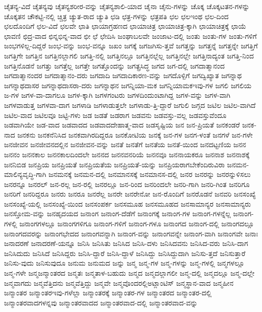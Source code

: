 {ಚೈತನ್ಯ-ವಿದೆ
ಚೈತನ್ಯವು
ಚೈತನ್ಯಶರೀರ-ವನ್ನು
ಚೈತನ್ಯಶಾಲಿ-ಯಾದ
ಚೈನಾ
ಚೈನು-ಗಳನ್ನು
ಚೊಕ್ಕ
ಚೊಕ್ಕಟತನ-ಗಳನ್ನು
ಚೊಕ್ಕತನ
ಚೌಕಟ್ಟಿ-ನಲ್ಲಿ
ಚ್ಚಿತ್ರ
ಚ್ಯುತ-ರಾದ
ಚ್ಯುತಿ
ಛಡಿ
ಛತ್ರ-ಗಳನ್ನು
ಛತ್ರಪತಿ
ಛಲ
ಛಲಇಂಥ
ಛಲ-ದಿಂದ
ಛಲದೊಂದಿಗೆ
ಛಲ-ವಿದೆ
ಛಲವೇ
ಛಾತಿ
ಛಾಯಾಗ್ರಹಣದ
ಛಾಯಾಚಿತ್ರ
ಛಾಯಾಚಿತ್ರ-ಕ್ಕಾಗಿ
ಛಾಯಾಚಿತ್ರಕ್ಕೆ
ಛಾಯೆ
ಛಾವಣಿ
ಛಿದ್ರ-ವಾದ
ಛಿನ್ನಭಿನ್ನ-ವಾದ
ಛೀ
ಛೆ
ಛೇದಿಸಿ
ಜಂಘಾಬಲವೇ
ಜಂಜಾಟ-ದಲ್ಲಿ
ಜಂತು
ಜಂತು-ಗಳ
ಜಂತು-ಗಳಿಗೆ
ಜಂಭಗಳಿಲ್ಲ-ದಿದ್ದರೆ
ಜಂಭ-ವನ್ನು
ಜಂಭ-ವನ್ನೂ
ಜಖಂ
ಜಗಕ್ಕೆ
ಜಗಜಗಿಸು-ತ್ತವೆ
ಜಗತ್ತನ್ನು
ಜಗತ್ತನ್ನೆ
ಜಗತ್ತನ್ನೇ
ಜಗತ್ತಿಗೆ
ಜಗತ್ತಿಗೇ
ಜಗತ್ತಿನ
ಜಗತ್ತಿನಲ್ಲಾಗಲಿ
ಜಗತ್ತಿ-ನಲ್ಲಿ
ಜಗತ್ತಿನಲ್ಲೂ
ಜಗತ್ತಿನಲ್ಲೆಲ್ಲ
ಜಗತ್ತಿನಲ್ಲೇ
ಜಗತ್ತಿನಾದ್ಯಂತ
ಜಗತ್ತಿ-ನಿಂದ
ಜಗತ್ತಿನೊಡನೆ
ಜಗತ್ತು
ಜಗತ್ತೆಲ್ಲ
ಜಗತ್ತೇ
ಜಗತ್ತೊಂದನ್ನು
ಜಗತ್ಪ್ರಸಿದ್ಧ
ಜಗದ
ಜಗ-ದಲ್ಲಿ
ಜಗದಾತ್ಮಾನಂದ
ಜಗದಾತ್ಮಾನಂದರ
ಜಗದಾತ್ಮಾನಂ-ದರು
ಜಗದಾದಿ
ಜಗದಾದಿಕಾರಣ-ವನ್ನು
ಜಗದೊಳ್ಪಿಗೆ
ಜಗದ್ವಿಖ್ಯಾತ
ಜಗನ್ನಾಥ
ಜಗನ್ನಾಥದಾಸರ
ಜಗನ್ನಾಥದಾಸರಾ-ದರು
ಜಗನ್ನಾಥನ
ಜಗನ್ನಿಯಾ-ಮಕ
ಜಗನ್ನಿಯಾಮಕಇವು-ಗಳ
ಜಗಲಿ
ಜಗಲಿಯ
ಜ-ಗಳ
ಜಗಳ-ವಾ-ದಾಗಲೂ
ಜಗಳ-ಕ್ಕಾಗಿ
ಜಗಳಗಂಟರು
ಜಗಳದಿಂದುಂಟಾಗಿದ್ದ
ಜಗಳ-ವನ್ನು
ಜಗಳ-ವಾಗಿ
ಜಗಳವಾಡುತ್ತ
ಜಗಳವಾ-ದಾಗ
ಜಗಳಾಡಿ
ಜಗಳಾಡುತ್ತಲೇ
ಜಗಳಾಡು-ತ್ತಿ-ದ್ದಾರೆ
ಜಗುಲಿ
ಜಗ್ಗದ
ಜಟಿಲ
ಜಟಿಲ-ವಾಗಿದೆ
ಜಟಿಲ-ವಾದ
ಜಟಿಲವೂ
ಜಟ್ಟಿ-ಗಳು
ಜಡ
ಜಡತೆ
ಜಡರಾಗ
ಜಡವನು
ಜಡವಸ್ತು-ವಲ್ಲ
ಜಡವಸ್ತುವೆಂದೂ
ಜಡವಾಗಿಯೇ
ಜಡ-ವಾದ
ಜಡವಾದದ
ಜಡವಾದದೇಹಾತ್ಮ-ವಾದ
ಜಡಸೃಷ್ಟಿಯ
ಜನ
ಜನ-ಪ್ರಿಯತೆ
ಜನಕಂಡರೆ
ಜನಕ-ನಾದ
ಜನಕನು
ಜನಕನೆನಿಸಿದ
ಜನಕವಾಗಿರದಿದ್ದರೂ
ಜನಕೋಟಿಯ
ಜನಕ್ಕೆ
ಜನ-ಗಳ
ಜನಗ-ಳಂತೆ
ಜನಗಳೆ
ಜನ-ಗಳೇ
ಜನಜೀವನ
ಜನಜೀವನದಲ್ಲಿನ
ಜನಜೀವನ-ವನ್ನು
ಜನತೆ
ಜನತೆಗೆ
ಜನತೆಯ
ಜನತೆ-ಯಿಂದ
ಜನದಟ್ಟಣಿಯ
ಜನನ
ಜನನಂ
ಜನನಕಾಲ
ಜನನಕಾಲದಿಂದಲೇ
ಜನನದ
ಜನನವನರಿಯೆ
ಜನನವೂ
ಜನನಾಯಕರೂ
ಜನನಾಶ
ಜನನಾಶಕ್ಕೆ
ಜನನಿಬಿಡ
ಜನಪ್ರಿಯ
ಜನಪ್ರಿಯತೆ
ಜನಪ್ರಿಯತೆಯ
ಜನಪ್ರಿಯತೆ-ಯನ್ನು
ಜನಪ್ರಿಯರಾಗಬೇಕೆಂದಿರುವಿರಾ
ಜನಮನ-ಮಾಲಿನ್ಯವೃದ್ಧಿ-ಗಾಗಿ
ಜನಮನಕ್ಕೆ
ಜನಮನ-ದಲ್ಲಿ
ಜನಮಾನಸಕ್ಕೆ
ಜನಮಾನಸ-ದಲ್ಲಿ
ಜನರ
ಜನರನ್ನು
ಜನರನ್ನುಳಿಸಲು
ಜನರನ್ನೂ
ಜನರಲ್
ಜನ-ರಲ್ಲ
ಜನ-ರಲ್ಲಿ
ಜನರಲ್ಲೂ
ಜನ-ರಿಂದ
ಜನರಿಂದಲೇ
ಜನರಿ-ಗಾಗಿ
ಜನರಿ-ಗಿಂತ
ಜನರಿಗೂ
ಜನರಿಗೆ
ಜನರಿದ್ದರೂ
ಜನರು
ಜನರೂ
ಜನರೆಲ್ಲ
ಜನರೇ
ಜನರೇನೋ
ಜನ-ರೊಂದಿಗೆ
ಜನರೊಡನೆ
ಜನವರಿ
ಜನಸಂಖ್ಯೆ
ಜನಸಂಖ್ಯೆ-ಯಲ್ಲಿ
ಜನಸಂಖ್ಯೆ-ಯಿಂದ
ಜನಸಂಪರ್ಕ
ಜನಸಮೂಹ
ಜನಸಮೂಹದ
ಜನಸಾಮಾನ್ಯರ
ಜನಸಾಮಾನ್ಯರು
ಜನಸ್ತೋಮ-ವನ್ನು
ಜನಹೃದಯದ
ಜನಾಂಗ
ಜನಾಂಗ-ದೆಡೆಗೆ
ಜನಾಂಗಕ್ಕೆ
ಜನಾಂಗ-ಗಳ
ಜನಾಂಗ-ಗಳನ್ನೆಲ್ಲ
ಜನಾಂಗ-ಗಳಲ್ಲಿ
ಜನಾಂಗಗಳಲ್ಲೂ
ಜನಾಂಗಗಳಿಗೂ
ಜನಾಂಗ-ಗಳಿಗೆ
ಜನಾಂಗ-ಗಳೂ
ಜನಾಂಗದ
ಜನಾಂಗ-ದಲ್ಲಿ
ಜನಾಂಗದಲ್ಲೂ
ಜನಾಂಗದವರನ್ನು
ಜನಾಂಗಭೇದದ
ಜನಾಂಗವನ್ನಾಗಿ
ಜನಾಂಗ-ವನ್ನು
ಜನಾಂಗವನ್ನೇ
ಜನಾಂಗ-ವಾಗಿ
ಜನಾಂಗವೇ
ಜನಾಃ
ಜನಾದರಣೆ
ಜನಾದರಣೆ-ಯನ್ನೂ
ಜನಿಸಿ
ಜನಿಸಿತು
ಜನಿಸಿದ
ಜನಿಸಿ-ದಳು
ಜನಿಸಿದವನು
ಜನಿಸಿದ-ವರು
ಜನಿಸಿ-ದಾಗ
ಜನಿಸಿದುದು
ಜನಿಸಿದೆ
ಜನಿಸಿದ್ದರು
ಜನಿಸಿ-ದ್ದಾರೆ
ಜನಿಸಿ-ದ್ದಾಳೆ
ಜನಿಸಿದ್ದು
ಜನಿಸಿದ್ದುದಾಗಿ
ಜನಿಸು-ತ್ತದೆ
ಜನಿಸುತ್ತಾರೆ
ಜನಿಸು-ವುದು
ಜನಿಸುವುದೂ
ಜನುಮ
ಜನುಮದ
ಜನ್ನು
ಜನ್ಮ
ಜನ್ಮ-ಗಳ
ಜನ್ಮ-ಗಳನ್ನು
ಜನ್ಮ-ಗಳಲ್ಲಿ
ಜನ್ಮಗಳಲ್ಲೂ
ಜನ್ಮ-ಗಳೇ
ಜನ್ಮಜನ್ಮಾಂತರದ
ಜನ್ಮತಃ
ಜನ್ಮತಾಳ-ಬಹುದು
ಜನ್ಮದ
ಜನ್ಮದಲ್ಲಾಗಲೀ
ಜನ್ಮ-ದಲ್ಲಿ
ಜನ್ಮದಲ್ಲೂ
ಜನ್ಮ-ದಲ್ಲೇ
ಜನ್ಮವಾಗದು
ಜನ್ಮವೆತ್ತಿದನು
ಜನ್ಮವೆತ್ತಿದ್ದು
ಜನ್ಮವೇ
ಜನ್ಮವೊಂದರಲ್ಲಿಅಟ್ಲಾಂಟಿಸ್
ಜನ್ಮಸ್ಥಾನ-ವಾದ
ಜನ್ಮಹೀನ
ಜನ್ಮಾಂತರ
ಜನ್ಮಾಂತರಇವು-ಗಳೆಲ್ಲಾ
ಜನ್ಮಾಂತರಕ್ಕೆ
ಜನ್ಮಾಂತರ-ಗಳ
ಜನ್ಮಾಂತರದ
ಜನ್ಮಾಂತರ-ದಲ್ಲಿ
ಜನ್ಮಾಂತರವಾದಗಳನ್ನವು
ಜನ್ಮಾಂತರವಾದದ
ಜನ್ಮಾಂತರವಾದ-ದಲ್ಲಿ
ಜನ್ಮಾಂತರವಾದ-ವನ್ನು
}
